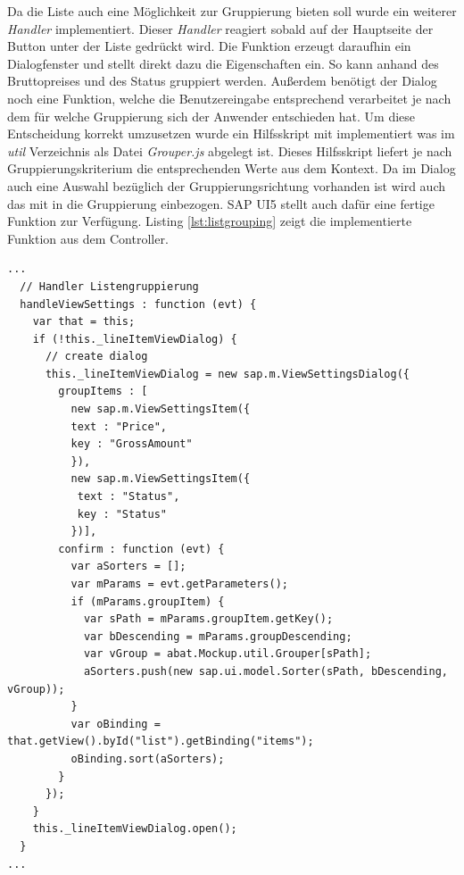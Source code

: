 Da die Liste auch eine Möglichkeit zur Gruppierung bieten soll wurde ein weiterer \textit{Handler} implementiert. Dieser \textit{Handler} reagiert sobald auf der Hauptseite der Button unter der Liste gedrückt wird. Die Funktion erzeugt daraufhin ein Dialogfenster und stellt direkt dazu die Eigenschaften ein. So kann anhand des Bruttopreises und des Status gruppiert werden. Außerdem benötigt der Dialog noch eine Funktion, welche die Benutzereingabe entsprechend verarbeitet je nach dem für welche Gruppierung sich der Anwender entschieden hat. Um diese Entscheidung korrekt umzusetzen wurde ein Hilfsskript mit implementiert was im \textit{util} Verzeichnis als Datei \textit{Grouper.js} abgelegt ist. Dieses Hilfsskript liefert je nach Gruppierungskriterium die entsprechenden Werte aus dem Kontext. Da im Dialog auch eine Auswahl bezüglich der Gruppierungsrichtung vorhanden ist wird auch das mit in die Gruppierung einbezogen. SAP UI5 stellt auch dafür eine fertige Funktion zur Verfügung. Listing \ref{lst:listgrouping} zeigt die implementierte Funktion aus dem Controller.

\vspace{1em}
\begin{lstlisting}[frame=htrbl, caption=Handler der Listengruppierung, label=lst:listgrouping]
...
  // Handler Listengruppierung
  handleViewSettings : function (evt) {
    var that = this;
    if (!this._lineItemViewDialog) {
      // create dialog
      this._lineItemViewDialog = new sap.m.ViewSettingsDialog({
        groupItems : [
          new sap.m.ViewSettingsItem({
          text : "Price",
          key : "GrossAmount"
          }),
          new sap.m.ViewSettingsItem({
           text : "Status",
           key : "Status"
          })],
        confirm : function (evt) {
          var aSorters = [];
          var mParams = evt.getParameters();
          if (mParams.groupItem) {
            var sPath = mParams.groupItem.getKey();
            var bDescending = mParams.groupDescending;
       	    var vGroup = abat.Mockup.util.Grouper[sPath];
       	    aSorters.push(new sap.ui.model.Sorter(sPath, bDescending, vGroup));
          }
          var oBinding = that.getView().byId("list").getBinding("items");
          oBinding.sort(aSorters);
        }
      });
    }
    this._lineItemViewDialog.open();
  }
...
\end{lstlisting}


